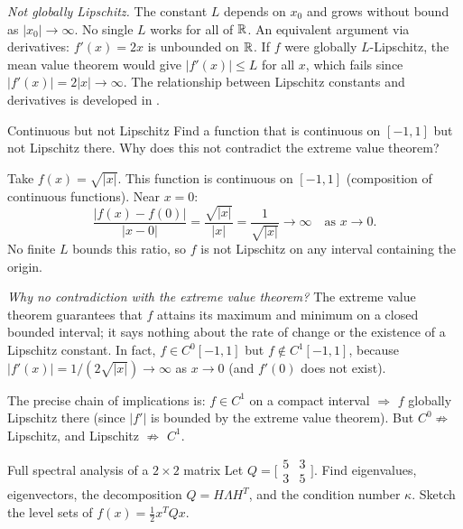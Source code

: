 \textit{Not globally Lipschitz.}
The constant $L$ depends on $x_0$ and grows without bound as $|x_0| \to \infty$.
No single $L$ works for all of $\mathbb{R}$.
An equivalent argument via derivatives: $f'(x) = 2x$ is unbounded on $\mathbb{R}$.
If $f$ were globally $L$-Lipschitz, the mean value theorem would give $|f'(x)| \leq L$ for all $x$, which fails since $|f'(x)| = 2|x| \to \infty$.
The relationship between Lipschitz constants and derivatives is developed in .

\begin{exercise}{Continuous but not Lipschitz}\label{ex:continuous-not-lipschitz}
	Find a function that is continuous on $[-1, 1]$ but not Lipschitz there.
	Why does this not contradict the extreme value theorem?
\end{exercise}

\solution
Take $f(x) = \sqrt{|x|}$.
This function is continuous on $[-1, 1]$ (composition of continuous functions).
Near $x = 0$:
\begin{equation}\label{eq:ex-sqrt-ratio}
	\frac{|f(x) - f(0)|}{|x - 0|} = \frac{\sqrt{|x|}}{|x|} = \frac{1}{\sqrt{|x|}} \to \infty \quad \text{as } x \to 0.
\end{equation}
No finite $L$ bounds this ratio, so $f$ is not Lipschitz on any interval containing the origin.

\textit{Why no contradiction with the extreme value theorem?}
The extreme value theorem guarantees that $f$ attains its maximum and minimum on a closed bounded interval; it says nothing about the rate of change or the existence of a Lipschitz constant.
In fact, $f \in C^0[-1,1]$ but $f \notin C^1[-1,1]$, because $|f'(x)| = 1/(2\sqrt{|x|}) \to \infty$ as $x \to 0$ (and $f'(0)$ does not exist).

The precise chain of implications is: $f \in C^1$ on a compact interval $\Rightarrow$ $f$ globally Lipschitz there (since $|f'|$ is bounded by the extreme value theorem). But $C^0 \not\Rightarrow$ Lipschitz, and Lipschitz $\not\Rightarrow$ $C^1$.

\begin{exercise}{Full spectral analysis of a $2 \times 2$ matrix}\label{ex:eigenvalues-2x2}
	Let $Q = \bigl[\begin{smallmatrix} 5 & 3 \\ 3 & 5 \end{smallmatrix}\bigr]$.
	Find eigenvalues, eigenvectors, the decomposition $Q = H\Lambda H^T$, and the condition number $\kappa$.
	Sketch the level sets of $f(x) = \frac{1}{2} x^T Q x$.
\end{exercise}

